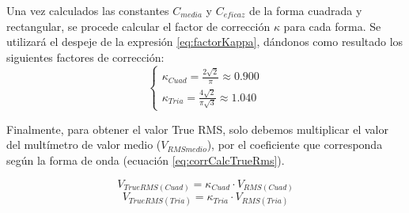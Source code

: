 Una vez calculados las constantes $C_{media}$ y $C_{eficaz}$ de la forma cuadrada y rectangular, se procede calcular el factor de corrección $\kappa$ para cada forma. Se utilizará el despeje de la expresión \ref{eq:factorKappa}, dándonos como resultado los siguientes factores de corrección:
\begin{equation}
    \begin{cases}
        \kappa_{Cuad}=\frac{2\sqrt{2}}{\pi} \approx 0.900\\
        \kappa_{Tria}=\frac{4\sqrt{2}}{\pi\sqrt{3}} \approx 1.040
    \end{cases}
\end{equation}

Finalmente, para obtener el valor True RMS, solo debemos multiplicar el valor del multímetro de valor medio ($V_{RMSmedio}$), por el coeficiente que corresponda según la forma de onda (ecuación \ref{eq:corrCalcTrueRms}).

\begin{equation}
    V_{TrueRMS(Cuad)} = \kappa_{Cuad} \cdot V_{RMS(Cuad)}
\end{equation}
\begin{equation}
    V_{TrueRMS(Tria)} = \kappa_{Tria} \cdot V_{RMS(Tria)}
\end{equation}















